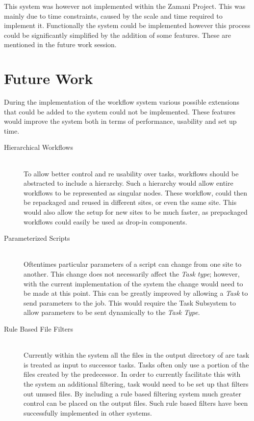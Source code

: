 This system was however not implemented within the Zamani Project. This was
mainly due to time constraints, caused by the scale and time required to
implement it. Functionally the system could be implemented however this process
could be significantly simplified by the addition of some features. These are
mentioned in the future work session.


\section{Future Work}
During the implementation of the workflow system various possible extensions
that could be added to the system could
not be implemented. These features would improve the system both in terms of
performance, usability and set up time. 
\begin{description}
\item[Hierarchical Workflows]\hfill \\
To allow better control and re usability over tasks, workflows should be
abstracted to include a hierarchy. Such a hierarchy would allow entire workflows
to be represented as singular nodes. These workflow, could then be repackaged
and reused in different sites, or even the same site. This would also allow the
setup for new sites to be much faster, as prepackaged workflows could easily be
used as drop-in components.
\item[Parameterized Scripts]\hfill \\
Oftentimes particular parameters of a script can change from one site to
another. This change does not necessarily affect the \emph{Task type}; however,
with the current implementation of the system the change would need to be made
at this point. This can be greatly improved by allowing a \emph{Task} to send
parameters to the job. This would require the Task Subsystem to allow parameters to
be sent dynamically to the \emph{Task Type}.
\item[Rule Based File Filters]\hfill \\
Currently within the system all the files in the output directory of are task is
treated as input to successor tasks. Tasks often only use a portion of the
files created by the predecessor. In order to currently facilitate this with the
system an additional filtering, task would need to be set up that filters out
unused files. By including a rule based filtering system much greater control
can be placed on the output files. Such rule based filters have been
successfully implemented in other systems\cite{conery2005rule}.

\end{description}
